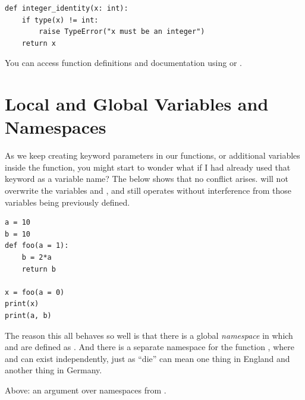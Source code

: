 \begin{lstlisting}
def integer_identity(x: int):
    if type(x) != int:
        raise TypeError("x must be an integer")
    return x
\end{lstlisting}


You can access function definitions and documentation using  or .



\section{Local and Global Variables and Namespaces}

As we keep creating keyword parameters in our functions, or additional variables inside the function, you might start to wonder what if I had already used that keyword as a variable name? The below shows that no conflict arises.  will not overwrite the variables  and , and  still operates without interference from those variables being previously defined. 
 
\begin{lstlisting}
a = 10
b = 10
def foo(a = 1):
    b = 2*a
    return b

x = foo(a = 0)
print(x)
print(a, b)
\end{lstlisting}

The reason this all behaves so well is that there is a global \emph{namespace} in which  and  are defined as . And there is a separate namespace for the function , where  and  can exist independently, just as ``die'' can mean one thing in England and another thing in Germany. 

\begin{center}
    
Above: an argument over namespaces from .
\end{center}


